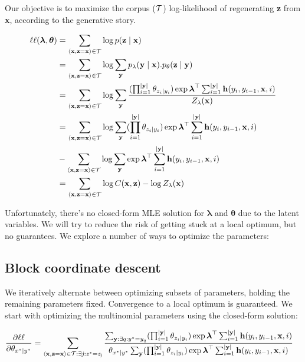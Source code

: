 \documentclass[11pt,onecolumn]{article}
\begin{document}
Our objective is to maximize the corpus ($\cal{T}$) log-likelihood of regenerating \textbf{z} from \textbf{x}, according to the generative story.

\begin{align}
\ell\ell(\boldsymbol{\lambda}, \boldsymbol{\theta}) &= \sum_{\langle\mathbf{x},\mathbf{z}=\mathbf{x}\rangle \in \cal{T}} \log p(\mathbf{z}\mid\mathbf{x}) \\
 &= \sum_{\langle\mathbf{x},\mathbf{z}=\mathbf{x}\rangle \in \cal{T}} \log \sum_{\mathbf{y}} p_\lambda(\mathbf{y}\mid\mathbf{x}).p_\theta(\mathbf{z}\mid\mathbf{y}) \\
 &= \sum_{\langle\mathbf{x},\mathbf{z}=\mathbf{x}\rangle \in \cal{T}} \log \sum_{\mathbf{y}} \frac{(\prod_{i=1}^{|\mathbf{y}|} \theta_{z_i\mid y_i}) \exp \boldsymbol{\lambda}^\top \sum_{i=1}^{|\mathbf{y}|} \mathbf{h}(y_i, y_{i-1}, \mathbf{x}, i)}{Z_\lambda(\mathbf{x})} \\
&= \sum_{\langle\mathbf{x},\mathbf{z}=\mathbf{x}\rangle \in \cal{T}} \log \sum_{\mathbf{y}} (\prod_{i=1}^{|\mathbf{y}|} \theta_{z_i\mid y_i}) \exp \boldsymbol{\lambda}^\top \sum_{i=1}^{|\mathbf{y}|} \mathbf{h}(y_i, y_{i-1}, \mathbf{x}, i) \nonumber \\
 &- \sum_{\langle\mathbf{x},\mathbf{z}=\mathbf{x}\rangle \in \cal{T}} \log \sum_{\mathbf{y}} \exp \boldsymbol{\lambda}^\top \sum_{i=1}^{|\mathbf{y}|} \mathbf{h}(y_i, y_{i-1}, \mathbf{x}, i) \\
&= \sum_{\langle\mathbf{x},\mathbf{z}=\mathbf{x}\rangle \in \cal{T}} \log C(\mathbf{x}, \mathbf{z}) - \log Z_\lambda(\mathbf{x})
\end{align}

Unfortunately, there's no closed-form MLE solution for $\boldsymbol{\lambda}$ and $\boldsymbol{\theta}$ due to the latent variables. We will try to reduce the risk of getting stuck at a local optimum, but no guarantees. We explore a number of ways to optimize the parameters:

\subsection{Block coordinate descent}

We iteratively alternate between optimizing subsets of parameters, holding the remaining parameters fixed. Convergence to a local optimum is guaranteed. We start with optimizing the multinomial parameters using the closed-form solution:

\begin{align}
\frac{\partial \ell\ell}{\partial \theta_{x^*|y^*}} &= \sum_{\langle\mathbf{x},\mathbf{z}=\mathbf{x}\rangle \in \cal{T} : \exists \mathit{j} : \mathit{z}^* = \mathit{z}_\mathit{j} } \frac{\sum_{\mathbf{y}:\exists q:y^*=y_q} (\prod_{i=1}^{|\mathbf{y}|} \theta_{z_i\mid y_i}) \exp \boldsymbol{\lambda}^\top \sum_{i=1}^{|\mathbf{y}|} \mathbf{h}(y_i, y_{i-1}, \mathbf{x}, i) }{\theta_{x^*|y^*} \sum_{\mathbf{y}} (\prod_{i=1}^{|\mathbf{y}|} \theta_{z_i\mid y_i}) \exp \boldsymbol{\lambda}^\top \sum_{i=1}^{|\mathbf{y}|} \mathbf{h}(y_i, y_{i-1}, \mathbf{x}, i)}
\end{align}
\end{document}
